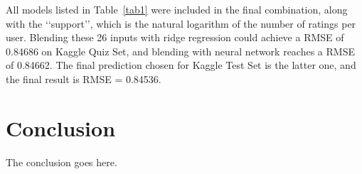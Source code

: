 \documentclass[journal]{IEEEtran}
\begin{document}
All models listed in Table~\ref{tab1} were included in the final combination, along with the \lq\lq{}support\rq\rq{}, which is the natural logarithm of the number of ratings per user. Blending these 26 inputs with ridge regression could achieve a RMSE of 0.84686 on Kaggle Quiz Set, and blending with neural network reaches a RMSE of 0.84662. The final prediction chosen for Kaggle Test Set is the latter one, and the final result is RMSE = 0.84536.



\section{Conclusion}
The conclusion goes here.



%


%
\end{document}
